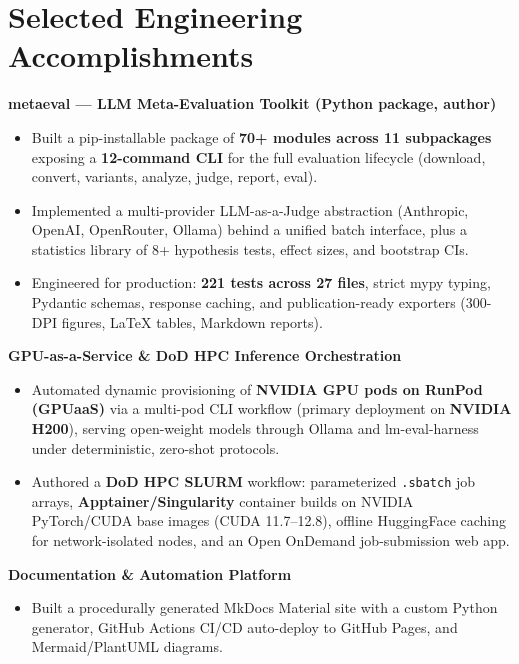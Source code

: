 \documentclass[10pt,letterpaper]{article}
\begin{document}
\section{Selected Engineering Accomplishments}
\textbf{metaeval --- LLM Meta-Evaluation Toolkit (Python package, author)}
\begin{itemize}
  \item Built a pip-installable package of \textbf{70+ modules across 11 subpackages} exposing a
        \textbf{12-command CLI} for the full evaluation lifecycle (download, convert, variants,
        analyze, judge, report, eval).
  \item Implemented a multi-provider LLM-as-a-Judge abstraction (Anthropic, OpenAI, OpenRouter,
        Ollama) behind a unified batch interface, plus a statistics library of 8+ hypothesis
        tests, effect sizes, and bootstrap CIs.
  \item Engineered for production: \textbf{221 tests across 27 files}, strict mypy typing, Pydantic
        schemas, response caching, and publication-ready exporters (300-DPI figures, LaTeX
        tables, Markdown reports).
\end{itemize}
\textbf{GPU-as-a-Service \& DoD HPC Inference Orchestration}
\begin{itemize}
  \item Automated dynamic provisioning of \textbf{NVIDIA GPU pods on RunPod (GPUaaS)} via a
        multi-pod CLI workflow (primary deployment on \textbf{NVIDIA H200}), serving open-weight
        models through Ollama and lm-eval-harness under deterministic, zero-shot protocols.
  \item Authored a \textbf{DoD HPC SLURM} workflow: parameterized \texttt{.sbatch} job arrays,
        \textbf{Apptainer/Singularity} container builds on NVIDIA PyTorch/CUDA base images
        (CUDA 11.7--12.8), offline HuggingFace caching for network-isolated nodes, and an
        Open OnDemand job-submission web app.
\end{itemize}
\textbf{Documentation \& Automation Platform}
\begin{itemize}
  \item Built a procedurally generated MkDocs Material site with a custom Python generator,
        GitHub Actions CI/CD auto-deploy to GitHub Pages, and Mermaid/PlantUML diagrams.
\end{itemize}

\end{document}
